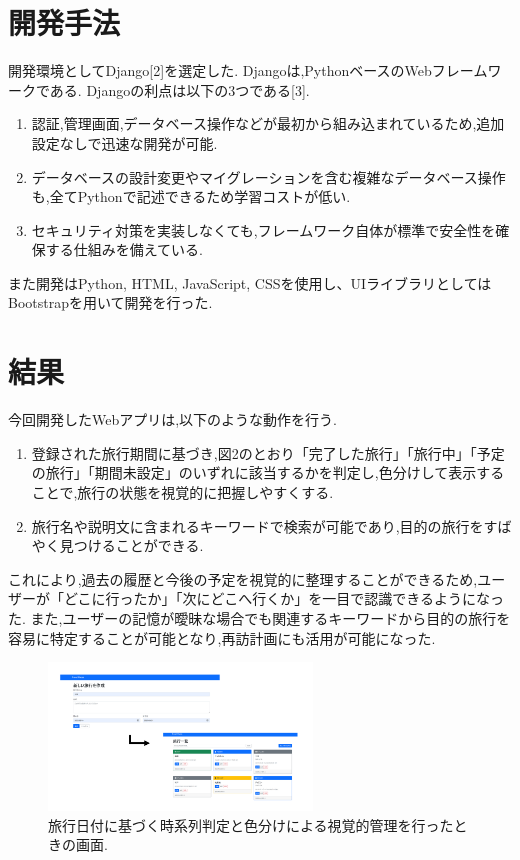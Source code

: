 \documentclass[a4j,twocolumn]{jsarticle}
\begin{document}
\section{開発手法}
\label{sec:orgc389e5f}
開発環境としてDjango[2]を選定した.
Djangoは,PythonベースのWebフレームワークである.
Djangoの利点は以下の3つである[3].
\begin{enumerate}
\item 認証,管理画面,データベース操作などが最初から組み込まれているため,追加設定なしで迅速な開発が可能.
\item データベースの設計変更やマイグレーションを含む複雑なデータベース操作も,全てPythonで記述できるため学習コストが低い.
\item セキュリティ対策を実装しなくても,フレームワーク自体が標準で安全性を確保する仕組みを備えている.
\end{enumerate}
また開発はPython, HTML, JavaScript, CSSを使用し、UIライブラリとしてはBootstrapを用いて開発を行った.

\section{結果}
\label{sec:org82fdcd1}
今回開発したWebアプリは,以下のような動作を行う.

\begin{enumerate}
\item 登録された旅行期間に基づき,図2のとおり「完了した旅行」「旅行中」「予定の旅行」「期間未設定」のいずれに該当するかを判定し,色分けして表示することで,旅行の状態を視覚的に把握しやすくする.
\item 旅行名や説明文に含まれるキーワードで検索が可能であり,目的の旅行をすばやく見つけることができる.
\end{enumerate}
これにより,過去の履歴と今後の予定を視覚的に整理することができるため,ユーザーが「どこに行ったか」「次にどこへ行くか」を一目で認識できるようになった.
また,ユーザーの記憶が曖昧な場合でも関連するキーワードから目的の旅行を容易に特定することが可能となり,再訪計画にも活用が可能になった.

\begin{figure}[htbp]
\centering
\includegraphics[width=7cm]{./figs/trip1.png}
\caption{\label{fig:org965160a}旅行日付に基づく時系列判定と色分けによる視覚的管理を行ったときの画面.}
\end{figure}
\end{document}

